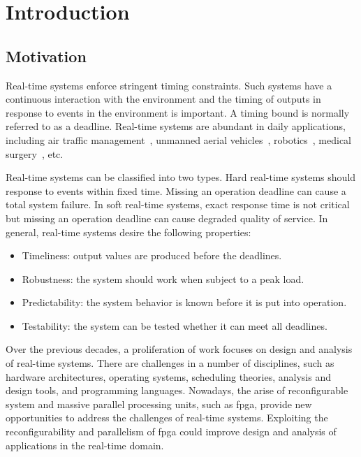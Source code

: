
\chapter{Introduction}

\section{Motivation}

Real-time systems enforce stringent timing constraints. Such systems have a continuous interaction with the environment and the timing of outputs in response to events in the environment is important. A timing bound is normally referred to as a deadline. Real-time systems are abundant in daily applications, including air traffic management~\cite{crisostomi07,eele11}, unmanned aerial vehicles~\cite{ortiz06}, robotics~\cite{dellaert99}, medical surgery~\cite{kwok10}, etc.

Real-time systems can be classified into two types. Hard real-time systems should response to events within fixed time. Missing an operation deadline can cause a total system failure. In soft real-time systems, exact response time is not critical but missing an operation deadline can cause degraded quality of service. In general, real-time systems desire the following properties:

\begin{itemize}
\item Timeliness: output values are produced before the deadlines.
\item Robustness: the system should work when subject to a peak load.
\item Predictability: the system behavior is known before it is put into operation.
\item Testability: the system can be tested whether it can meet all deadlines.
\end{itemize}

Over the previous decades, a proliferation of work focuses on design and analysis of real-time systems. There are challenges in a number of disciplines, such as hardware architectures, operating systems, scheduling theories, analysis and design tools, and programming languages. Nowadays, the arise of reconfigurable system and massive parallel processing units, such as \gls{fpga}, provide new opportunities to address the challenges of real-time systems. Exploiting the reconfigurability and parallelism of \gls{fpga} could improve design and analysis of applications in the real-time domain.

